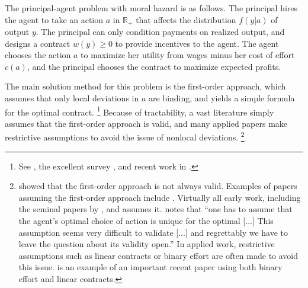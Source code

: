 The principal-agent problem with moral hazard is as follows. The principal hires the agent to take an action $a$ in $\mathbb R _ +$ that affects the distribution $f(y|a)$ of output $y$. The principal can only condition payments on realized output, and designs a contract $w(y) \geq 0$ to provide incentives to the agent. The agent chooses the action $a$ to maximize her utility from wages minus her cost of effort $c(a)$, and the principal chooses the contract to maximize expected profits.

The main solution method for this problem is the first-order approach, which assumes that only local deviations in $a$ are binding, and yields a simple formula for the optimal contract.%
\footnote{%
See \textcite{holmstrom1978incentives}, the excellent survey \textcite{georgiadis2022contracting}, and recent work in \textcite{conlon2009two,kadan2017existence,chade2020no,chaigneau2022should,castro2024disentangling}.
}
Because of tractability, a vast literature simply assumes that the first-order approach is valid, and many applied papers make restrictive assumptions to avoid the issue of nonlocal deviations.%
\footnote{%
\textcite{mirrlees1999} showed that the first-order approach is not always valid. Examples of papers assuming the first-order approach include \textcite{jewitt2008moral, moroni2014existence, chaigneau2022should,castro2024disentangling}. Virtually all early work, including the seminal papers by \textcite{holmstrom1978incentives, holmstrom1979moral}, and \textcite{zeckhauser1970medical} assumes it. \textcite{holmstrom1979moral} notes that 
``one has to assume that the agent's optimal choice of action is unique
for the optimal [...] This assumption seems very difficult to validate [...] and regrettably we have to leave the question about its validity open.'' In applied work, restrictive assumptions such as linear contracts or binary effort are often made to avoid this issue. \textcite{edmans2009multiplicative} is an example of an important recent paper using both binary effort and linear contracts.
}

